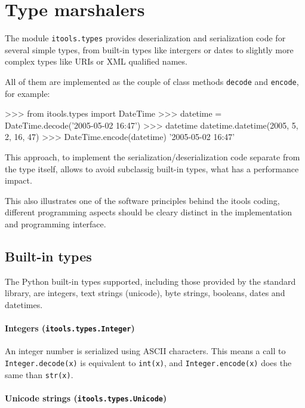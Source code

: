 
\chapter{Type marshalers}


The module {\tt itools.types} provides deserialization and serialization
code for several simple types, from built-in types like intergers or dates
to slightly more complex types like URIs or XML qualified names.

All of them are implemented as the couple of class methods {\tt decode}
and {\tt encode}, for example:

\begin{code}
    >>> from itools.types import DateTime
    >>> datetime = DateTime.decode('2005-05-02 16:47')
    >>> datetime
    datetime.datetime(2005, 5, 2, 16, 47)
    >>> DateTime.encode(datetime)
    '2005-05-02 16:47'
\end{code}

This approach, to implement the serialization/deserialization code separate
from the type itself, allows to avoid subclassig built-in types, what has a
performance impact.

This also illustrates one of the software principles behind the itools coding,
different programming aspects should be cleary distinct in the implementation
and programming interface.


\section{Built-in types}

The Python built-in types supported, including those provided by the
standard library, are integers, text strings (unicode), byte strings,
booleans, dates and datetimes.

\subsubsection{Integers ({\tt itools.types.Integer})}

An integer number is serialized using ASCII characters. This means a call to
{\tt Integer.decode(x)} is equivalent to {\tt int(x)}, and
{\tt Integer.encode(x)} does the same than {\tt str(x)}.

\subsubsection{Unicode strings ({\tt itools.types.Unicode})}

